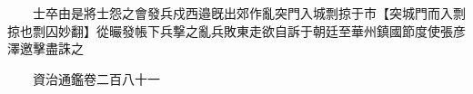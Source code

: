 　　士卒由是將士怨之會發兵戍西邉旣出郊作亂突門入城剽掠于市【突城門而入剽掠也剽囚妙翻】從曮發帳下兵撃之亂兵敗東走欲自訴于朝廷至華州鎮國節度使張彦澤邀擊盡誅之

　　資治通鑑卷二百八十一


    


 


 



 

 
  







 


　　
　　
　
　
　


　　

　















	
	









































 
  



















 





 












  
  
  

 





